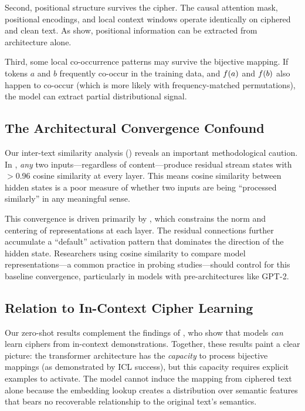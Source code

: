 Second, positional structure survives the cipher. The causal attention mask, positional encodings, and local context windows operate identically on ciphered and clean text. As \citet{haviv2022positional} show, positional information can be extracted from architecture alone.

Third, some local co-occurrence patterns may survive the bijective mapping. If tokens $a$ and $b$ frequently co-occur in the training data, and $f(a)$ and $f(b)$ also happen to co-occur (which is more likely with frequency-matched permutations), the model can extract partial distributional signal.

\subsection{The Architectural Convergence Confound}
\label{sec:confound}

Our inter-text similarity analysis () reveals an important methodological caution. In \gpttwo, \emph{any} two inputs---regardless of content---produce residual stream states with $>$0.96 cosine similarity at every layer. This means cosine similarity between hidden states is a poor measure of whether two inputs are being ``processed similarly'' in any meaningful sense.

This convergence is driven primarily by \layernorm, which constrains the norm and centering of representations at each layer. The residual connections further accumulate a ``default'' activation pattern that dominates the direction of the hidden state. Researchers using cosine similarity to compare model representations---a common practice in probing studies---should control for this baseline convergence, particularly in models with pre-\layernorm architectures like GPT-2.

\subsection{Relation to In-Context Cipher Learning}
\label{sec:icl}

Our zero-shot results complement the findings of \citet{fang2025iclciphers}, who show that models \emph{can} learn ciphers from in-context demonstrations. Together, these results paint a clear picture: the transformer architecture has the \emph{capacity} to process bijective mappings (as demonstrated by ICL success), but this capacity requires explicit examples to activate. The model cannot induce the mapping from ciphered text alone because the embedding lookup creates a distribution over semantic features that bears no recoverable relationship to the original text's semantics.

